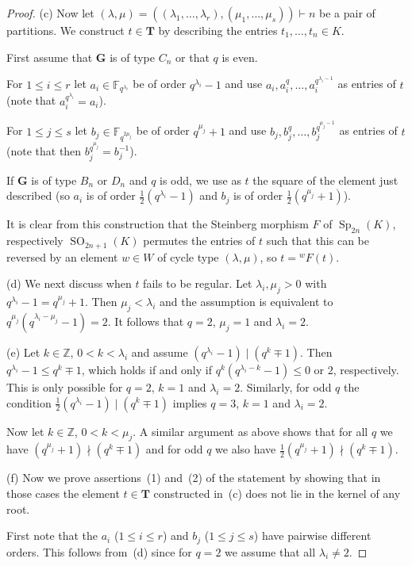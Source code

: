 \documentclass{ert-l}
\newcommand{\FF}{{\mathbb{F}}}
\newcommand{\ZZ}{{\mathbb{Z}}}
\newcommand{\bG}{{\mathbf{G}}}
\newcommand{\bT}{{\mathbf{T}}}
\newcommand{\Sp}{{\operatorname{Sp}}}
\newcommand{\SO}{{\operatorname{SO}}}
\let\la=\lambda
\theoremstyle{definition}
\theoremstyle{remark}
\begin{document}
\begin{proof}
(c) Now let $(\la,\mu) = ((\la_1, \ldots, \la_r),(\mu_1, \ldots, \mu_s))
\vdash n$ be a pair of partitions. We construct $t \in \bT$ by describing
the entries $t_1, \ldots, t_n \in K$.

First assume that $\bG$ is of type $C_n$ or that $q$ is even.

For $1 \leq i \leq r$ let $a_i \in \FF_{q^{\la_i}}$ be of order $q^{\la_i}-1$
and use $a_i, a_i^q, \ldots, a_i^{q^{\la_i-1}}$ as entries of $t$ (note that
$a_i^{q^{\la_i}} = a_i$).

For $1 \leq j \leq s$ let $b_j \in \FF_{q^{2\mu_j}}$ be of order
$q^{\mu_j}+1$ and use $b_j, b_j^q, \ldots, b_j^{q^{\mu_j-1}}$ as entries of
$t$ (note that then $b_j^{q^{\mu_j}} = b_j^{-1}$).

If $\bG$ is of type $B_n$ or $D_n$ and $q$ is odd, we use as $t$ the square
of the element just described (so $a_i$ is of order $\frac{1}{2}(q^{\la_i}-1)$
and $b_j$ is of order $\frac{1}{2}(q^{\mu_j}+1)$).

It is clear from this construction that the Steinberg morphism $F$ of
$\Sp_{2n}(K)$, respectively $\SO_{2n+1}(K)$ permutes the entries of $t$ such
that this can be reversed by an element $w \in W$ of cycle type $(\la,\mu)$,
so $t = {}^wF(t)$.

(d) We next discuss when $t$ fails to be regular. Let $\la_i,\mu_j>0$ with
$q^{\la_i}-1 = q^{\mu_j}+1$. Then $\mu_j < \la_i$ and the assumption is
equivalent to $q^{\mu_j}(q^{\la_i-\mu_j}-1) = 2$. It follows that $q=2$,
$\mu_j=1$ and  $\la_i=2$.

(e) Let $k \in \ZZ$, $0 < k < \la_i$ and assume $(q^{\la_i}-1)\mid(q^k \mp 1)$.
Then $q^{\la_i}-1 \leq q^k \mp 1$, which holds
if and only if $q^k(q^{\la_i-k} -1) \leq 0$ or $2$, respectively. This is only
possible for $q=2$, $k=1$ and $\la_i=2$. Similarly, for odd $q$ the condition
$\frac{1}{2}(q^{\la_i}-1)\mid (q^k \mp 1)$ implies $q=3$, $k=1$ and $\la_i=2$.

Now let $k \in \ZZ$, $0 < k < \mu_j$.
A similar argument as above shows that for all $q$ we have
$(q^{\mu_j}+1) \nmid (q^k \mp 1)$ and for odd $q$ we also have
$\frac{1}{2}(q^{\mu_j}+1) \nmid (q^k \mp 1)$.

(f) Now we prove assertions~(1) and~(2) of the statement by showing that in
those cases the element $t\in\bT$ constructed in~(c) does not lie in the kernel
of any root.

First note that the $a_i$ ($1\leq i \leq r$) and $b_j$ ($1 \leq j \leq s$)
have pairwise different orders. This follows from~(d) since for $q=2$ we
assume that all $\la_i \neq 2$.


\end{proof}
\end{document}
